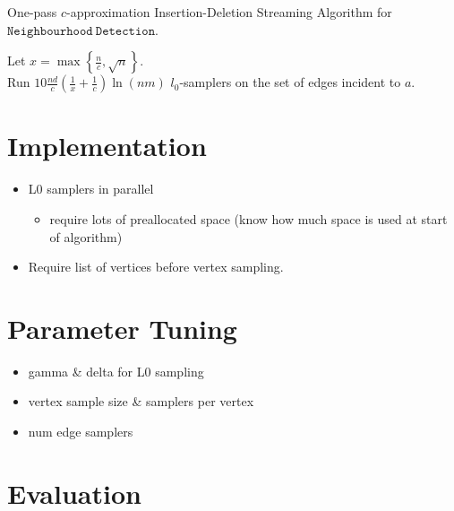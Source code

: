 \documentclass[11pt,twoside,a4paper]{report}
\begin{document}
\begin{algorithm}[H]
	\caption{One-pass $c$-approximation Insertion-Deletion Streaming Algorithm for $\mathtt{Neighbourhood\ Detection}$. }
	Let $x=\max\left\{\frac{n}{c},\sqrt{n}\right\}$.\\
	Run $10\frac{nd}{c}\left(\frac1x+\frac1c\right)\ln (nm)$ $l_0$-samplers on the set of edges incident to $a$.\\
\end{algorithm}

\section{Implementation}

\begin{itemize}
	\item L0 samplers in parallel
	\begin{itemize}
		\item require lots of preallocated space (know how much space is used at start of algorithm)
	\end{itemize}
	\item Require list of vertices before vertex sampling.
\end{itemize}

\section{Parameter Tuning}

\begin{itemize}
	\item gamma \& delta for L0 sampling
	\item vertex sample size \& samplers per vertex
	\item num edge samplers
\end{itemize}

\section{Evaluation}

\end{document}
